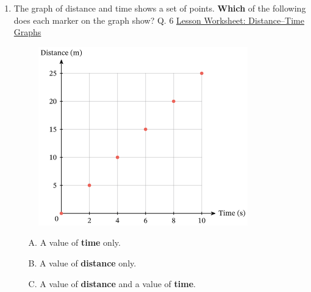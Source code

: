 \documentclass[A4,12pt]{article}
\begin{document}
\begin{enumerate}[label=\bfseries (\arabic*)]
\item The graph of distance and time shows a set of points. \textbf{Which} of the following does each marker on the graph show? \cite{Nagwa} Q. 6 \href{https://www.nagwa.com/en/worksheets/964158724874/}{Lesson Worksheet: Distance–Time Graphs}
%
\begin{figure}[H]
    \centering
    \includegraphics{Nagwa_Q6_kin.png}
\end{figure}
%
\begin{itemize}
    \item[A.] A value of \textbf{time} only.
    \item[B.] A value of \textbf{distance} only.
    \item[C.] A value of \textbf{distance} and a value of \textbf{time}.
\end{itemize}









\end{enumerate}
\end{document}

